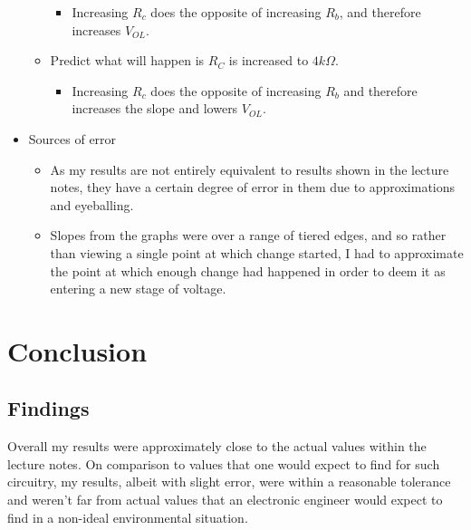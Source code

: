 \documentclass[12pt]{article}
\begin{document}
\begin{itemize}
\begin{itemize}
\begin{itemize}
\item Increasing $R_c$ does the opposite of increasing $R_b$, and therefore increases $V_{OL}$.
\end{itemize}
\item Predict what will happen is $R_C$ is increased to $4k\Omega$.
\begin{itemize}
\item Increasing $R_c$ does the opposite of increasing $R_b$ and therefore increases the slope and lowers $V_{OL}$.
\end{itemize}
\end{itemize}
\item Sources of error
\begin{itemize}
\item As my results are not entirely equivalent to results shown in the lecture notes, they have a certain degree of error in them due to approximations and eyeballing.
\item Slopes from the graphs were over a range of tiered edges, and so rather than viewing a single point at which change started, I had to approximate the point at which enough change had happened in order to deem it as entering a new stage of voltage.
\end{itemize}
\end{itemize}
\section{Conclusion}
\subsection{Findings}
Overall my results were approximately close to the actual values within the lecture notes. On comparison to values that one would expect to find for such circuitry, my results, albeit with slight error, were within a reasonable tolerance and weren't far from actual values that an electronic engineer would expect to find in a non-ideal environmental situation.
\end{document}
